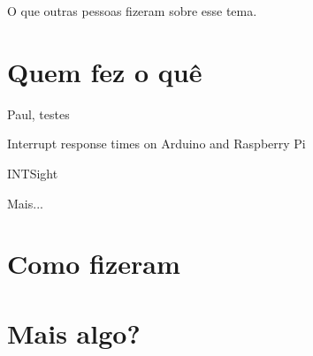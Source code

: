 
O que outras pessoas fizeram sobre esse tema.

\section{Quem fez o quê}

Paul, testes \cite{Regnier2008}

Interrupt response times on Arduino and Raspberry Pi \cite{Solc2016}

INTSight \cite{Gerhorst2018}

Mais...

\section{Como fizeram}
\section{Mais algo?}